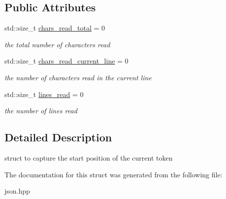 \subsection*{Public Attributes}
\begin{DoxyCompactItemize}
\item 
\mbox{\label{structnlohmann_1_1detail_1_1position__t_a94cf85cd91d478c20ae143eba906ea1a}} 
std\+::size\+\_\+t \mbox{\hyperlink{structnlohmann_1_1detail_1_1position__t_a94cf85cd91d478c20ae143eba906ea1a}{chars\+\_\+read\+\_\+total}} = 0
\begin{DoxyCompactList}\small\item\em the total number of characters read \end{DoxyCompactList}\item 
\mbox{\label{structnlohmann_1_1detail_1_1position__t_a74df94563dd32102152ceb8c6d9041d8}} 
std\+::size\+\_\+t \mbox{\hyperlink{structnlohmann_1_1detail_1_1position__t_a74df94563dd32102152ceb8c6d9041d8}{chars\+\_\+read\+\_\+current\+\_\+line}} = 0
\begin{DoxyCompactList}\small\item\em the number of characters read in the current line \end{DoxyCompactList}\item 
\mbox{\label{structnlohmann_1_1detail_1_1position__t_a4bbad8bc2c0d17c1b61c3ce729908b71}} 
std\+::size\+\_\+t \mbox{\hyperlink{structnlohmann_1_1detail_1_1position__t_a4bbad8bc2c0d17c1b61c3ce729908b71}{lines\+\_\+read}} = 0
\begin{DoxyCompactList}\small\item\em the number of lines read \end{DoxyCompactList}\end{DoxyCompactItemize}


\subsection{Detailed Description}
struct to capture the start position of the current token 

The documentation for this struct was generated from the following file\+:\begin{DoxyCompactItemize}
\item 
json.\+hpp\end{DoxyCompactItemize}
